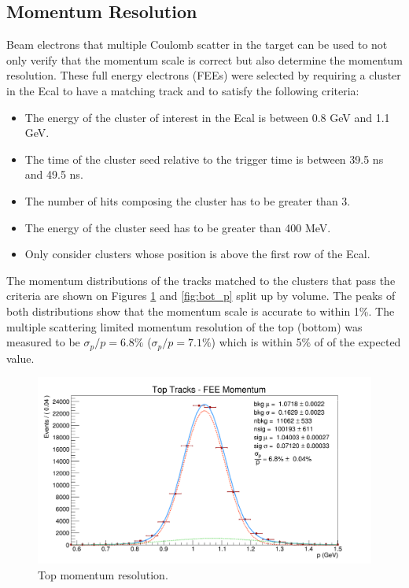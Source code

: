 \subsection{Momentum Resolution}

Beam electrons that multiple Coulomb scatter in the target can be used to 
not only verify that the momentum scale is correct but also determine the 
momentum resolution.  These full energy electrons (FEEs) 
were selected by requiring a cluster in the Ecal to have a matching track and
to satisfy the following criteria:
\begin{itemize}
    \item The energy of the cluster of interest in the Ecal  is between 0.8 GeV
          and 1.1 GeV.
    \item The time of the cluster seed relative to the trigger time is between
          39.5 ns and 49.5 ns.
    \item The number of hits composing the cluster has to be greater than 3.
    \item The energy of the cluster seed has to be greater than 400 MeV.
    \item Only consider clusters whose position is above the first row of the 
          Ecal.
\end{itemize}
The momentum distributions of the tracks matched to the clusters that pass the
criteria are shown on Figures \ref{fig:top_p} and \ref{fig:bot_p} split up by volume.  The peaks
of both distributions show that the momentum scale is accurate to within 1\%.  The 
multiple scattering limited momentum resolution of the top (bottom) was measured
to be $\sigma_{p}/p = 6.8\%$ ($\sigma_{p}/p = 7.1\%$) which 
is within 5\% of of the expected value.
\begin{figure}[h!t]
    \centering
    \includegraphics[width=.95\textwidth]{images/20160424_fee_top_tracks_p.png}
    \caption{Top momentum resolution.}
    \label{fig:top_p}
\end{figure}
